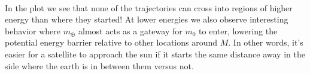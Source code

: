\documentclass[11pt]{article}
\begin{document}
\\
\noindent
In the plot we see that none of the trajectories can cross into regions of higher energy than where they started! At lower energies we also observe interesting behavior where $m_\oplus$ almost acts as a gateway for $m_0$ to enter, lowering the potential energy barrier relative to other locations around $M$. In other words, it's easier for a satellite to approach the sun if it starts the same distance away in the side where the earth is in between them versus not.





\end{document}
